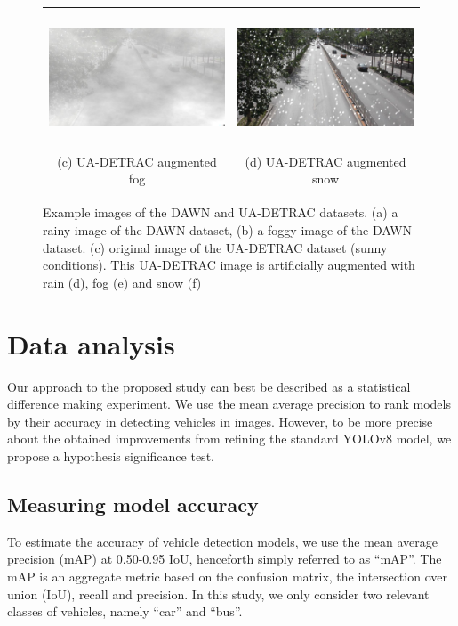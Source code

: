 \documentclass[]{article}
\begin{document}
\begin{figure}[H]
\begin{tabular}{cc}
			\includegraphics[width=65mm, height=40mm]{detrac-fog-fullres.png} &   \includegraphics[width=65mm, height=40mm]{detrac-snow-fullres.png} \\
			(c) UA-DETRAC augmented fog & (d) UA-DETRAC augmented snow \\[6pt]
		\end{tabular}
		\caption{Example images of the DAWN and UA-DETRAC datasets.  (a) a rainy image of the DAWN dataset, (b) a foggy image of the DAWN dataset.  (c) original image of the UA-DETRAC dataset (sunny conditions).  This UA-DETRAC image is artificially augmented with rain (d), fog (e) and snow (f) }
		\label{fig:example-images}
	\end{figure}


\section{Data analysis}

	Our approach to the proposed study can best be described as a statistical difference making experiment. We use the mean average precision to rank models by their accuracy in detecting vehicles in images. However, to be more precise about the obtained improvements from refining the standard YOLO{\small v8} model, we propose a hypothesis significance test. 
	
\subsection{Measuring model accuracy}

	To estimate the accuracy of vehicle detection models, we use the mean average precision (mAP) at 0.50-0.95 IoU, henceforth simply referred to as ``mAP''. The mAP is an aggregate metric based on the confusion matrix, the intersection over union (IoU), recall and precision. In this study, we only consider two relevant classes of vehicles, namely ``car'' and ``bus''.
\end{document}

